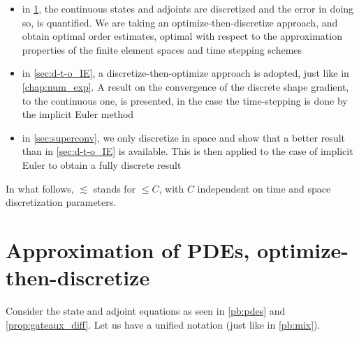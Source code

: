 \documentclass[english,a4paper,9pt,oneside]{scrbook}	%
\theoremstyle{break}
\theoremstyle{remark}
\begin{document}
\begin{itemize}
	\item in \cref{sec:o-t-d}, the continuous states and adjoints are discretized and the error in doing so, is quantified. We are taking an optimize-then-discretize approach, and obtain optimal order estimates, optimal with respect to the approximation properties of the finite element spaces and time stepping schemes
	\item in \cref{sec:d-t-o_IE}, a discretize-then-optimize approach is adopted, just like in \cref{chap:num_exp}. A result on the convergence of the discrete shape gradient, to the continuous one, is presented, in the case the time-stepping is done by the implicit Euler method
	\item in \cref{sec:superconv}, we only discretize in space and show that a better result than in \cref{sec:d-t-o_IE} is available. This is then applied to the case of implicit Euler to obtain a fully discrete result
	

\end{itemize}

In what follows, $\lesssim$ stands for $\leq C$, with $C$ independent on time and space discretization parameters.

\section{Approximation of PDEs, optimize-then-discretize}
\label{sec:o-t-d}

Consider the state and adjoint equations as seen in \cref{pb:pdes} and \cref{prop:gateaux_diff}. Let us have a unified notation (just like in \cref{pb:mix}).
\end{document}

